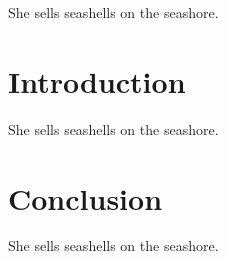 She sells seashells on the seashore.

\section{Introduction}

She sells seashells on the seashore.

\section{Conclusion}

She sells seashells on the seashore.
